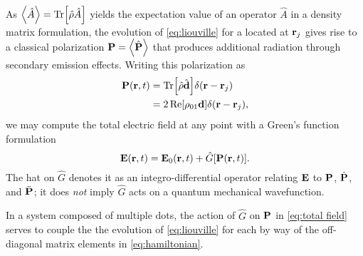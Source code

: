 As $\expval{\hat{A}} = \Tr[\hat{\rho}\hat{A}]$ yields the expectation value of an operator $\hat{A}$ in a density matrix formulation, the evolution of \cref{eq:liouville} for a \qd{} located at $\vb{r}_j$ gives rise to a classical polarization $\vb{P} = \expval{\hat{\vb{P}}}$ that produces additional radiation through secondary emission effects.
Writing this polarization as
\begin{equation}
  \begin{aligned}
    \vb{P}(\vb{r}, t) &= \Tr[\hat{\rho} \hat{\vb{d}}] \delta(\vb{r} - \vb{r}_j) \\
                      &= 2 \Re[\rho_{01}\vb{d}]\delta(\vb{r} - \vb{r}_j),
  \end{aligned}
\end{equation}
we may compute the total electric field at any point with a Green's function formulation
\begin{equation}
  \vb{E}(\vb{r}, t) = \vb{E}_0(\vb{r}, t) + \hat{G}\qty[ \vb{P}(\vb{r}, t) ].
  \label{eq:total field}
\end{equation}
The hat on $\hat{G}$ denotes it as an integro-differential operator relating $\vb{E}$ to $\vb{P}$, $\dot{\vb{P}}$, and $\ddot{\vb{P}}$; it does \emph{not} imply $\hat{G}$ acts on a quantum mechanical wavefunction.

In a system composed of multiple dots, the action of $\hat{G}$ on $\vb{P}$ in \cref{eq:total field} serves to couple the the evolution of \cref{eq:liouville} for each \qd{} by way of the off-diagonal matrix elements in \cref{eq:hamiltonian}.
